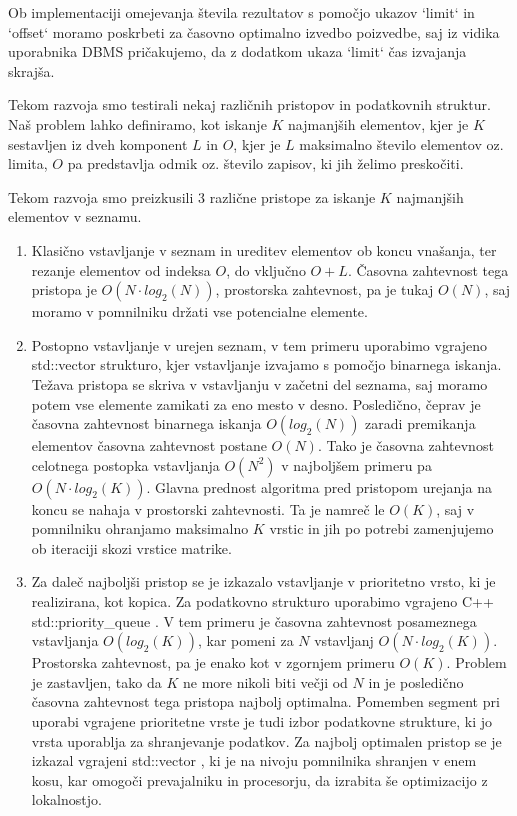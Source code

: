 \documentclass[a4paper,12pt,openright]{book}
\begin{document}
        Ob implementaciji omejevanja števila rezultatov s pomočjo ukazov `limit` in `offset` moramo poskrbeti za časovno optimalno izvedbo poizvedbe, saj iz vidika uporabnika DBMS pričakujemo, da z dodatkom ukaza `limit` čas izvajanja skrajša.

        Tekom razvoja smo testirali nekaj različnih pristopov in podatkovnih struktur. Naš problem lahko definiramo, kot iskanje $K$ najmanjših elementov, kjer je $K$ sestavljen iz dveh komponent $L$ in $O$, kjer je $L$ maksimalno število elementov oz. limita, $O$ pa predstavlja odmik oz. število zapisov, ki jih želimo preskočiti.

        Tekom razvoja smo preizkusili 3 različne pristope za iskanje $K$ najmanjših elementov v seznamu.

        \begin{enumerate}
            \item Klasično vstavljanje v seznam in ureditev elementov ob koncu vnašanja, ter rezanje elementov od indeksa $O$, do vključno $O+L$. Časovna zahtevnost tega pristopa je $O(N \cdot log_2(N))$, prostorska zahtevnost, pa je tukaj $O(N)$, saj moramo v pomnilniku držati vse potencialne elemente.
            \item Postopno vstavljanje v urejen seznam, v tem primeru uporabimo vgrajeno std::vector \cite{CPP_VECTOR} strukturo, kjer vstavljanje izvajamo s pomočjo binarnega iskanja. Težava pristopa se skriva v vstavljanju v začetni del seznama, saj moramo potem vse elemente zamikati za eno mesto v desno. Posledično, čeprav je časovna zahtevnost binarnega iskanja $O(log_2(N))$ zaradi premikanja elementov časovna zahtevnost postane $O(N)$. Tako je časovna zahtevnost celotnega postopka vstavljanja $O(N^2)$ v najboljšem primeru pa $O(N \cdot log_2(K))$. Glavna prednost algoritma pred pristopom urejanja na koncu se nahaja v prostorski zahtevnosti. Ta je namreč le $O(K)$, saj v pomnilniku ohranjamo maksimalno $K$ vrstic in jih po potrebi zamenjujemo ob iteraciji skozi vrstice matrike.
            \item Za daleč najboljši pristop se je izkazalo vstavljanje v prioritetno vrsto, ki je realizirana, kot kopica. Za podatkovno strukturo uporabimo vgrajeno C++ std::priority\_queue \cite{CPP_PQUEUE}. V tem primeru je časovna zahtevnost posameznega vstavljanja $O(log_2(K))$, kar pomeni za $N$ vstavljanj $O(N \cdot log_2(K))$. Prostorska zahtevnost, pa je enako kot v zgornjem primeru $O(K)$. Problem je zastavljen, tako da $K$ ne more nikoli biti večji od $N$ in je posledično časovna zahtevnost tega pristopa najbolj optimalna. Pomemben segment pri uporabi vgrajene prioritetne vrste je tudi izbor podatkovne strukture, ki jo vrsta uporablja za shranjevanje podatkov. Za najbolj optimalen pristop se je izkazal vgrajeni std::vector \cite{CPP_VECTOR}, ki je na nivoju pomnilnika shranjen v enem kosu, kar omogoči prevajalniku in procesorju, da izrabita še optimizacijo z lokalnostjo.
        \end{enumerate}
\end{document}
